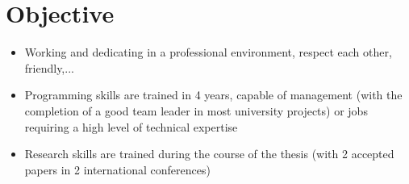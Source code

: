 \documentclass[letterpaper,11pt]{article}
\newcommand{\resumeItemNornal}[1]{
  \item\small{
    {#1 \vspace{-2pt}}
  }
}
\newcommand{\resumeSubItemNormal}[1]{\resumeItemNornal{#1}\vspace{-4pt}}
\newcommand{\resumeSubHeadingListStart}{\begin{itemize}[leftmargin=*]}
\newcommand{\resumeSubHeadingListEnd}{\end{itemize}}
\begin{document}
\section{Objective}
  \resumeSubHeadingListStart
    \resumeSubItemNormal{Working and dedicating in a professional environment, respect each other, friendly,...}
    \resumeSubItemNormal{Programming skills are trained in 4 years, capable of management (with the completion of a good team leader in most university projects) or jobs requiring a high level of technical expertise}
    \resumeSubItemNormal{Research skills are trained during the course of the thesis (with 2 accepted papers in 2 international conferences)}
  \resumeSubHeadingListEnd

\end{document}
